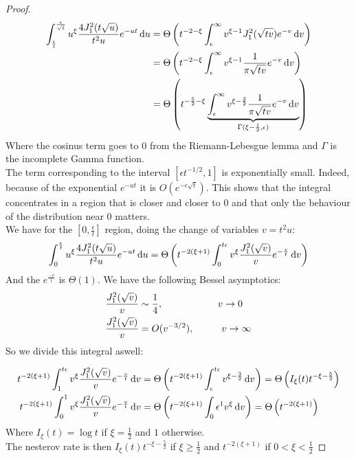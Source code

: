 \documentclass{article}
\begin{document}
\begin{proof}
\begin{align}
    \int_{\frac{\epsilon}{t}}^{\frac{\epsilon}{\sqrt{t}}} u^{\xi}\frac{4J_1^2(t\sqrt{u})}{t^2u}e^{-u t}\mathop{}\!\mathrm{d} u &=\Theta\left(
    t^{-2-\xi}\int_\epsilon^\infty v^{\xi-1}J_1^2(\sqrt{tv})e^{-v}\mathop{}\!\mathrm{d} v\right)\\
    &=\Theta\left( t^{-2-\xi}\int_\epsilon^\infty v^{\xi-1}\frac{1}{\pi\sqrt{tv}}e^{-v}\mathop{}\!\mathrm{d} v \right)\\
    &=\Theta\left(t^{-\frac{5}{2}-\xi}\underbrace{\int_\epsilon^\infty v^{\xi-\frac{3}{2}}\frac{1}{\pi\sqrt{tv}}e^{-v}\mathop{}\!\mathrm{d} v}_{\Gamma(\xi-\frac{1}{2},\epsilon) }\right)
\end{align}
Where the cosinus term goes to $0$ from the Riemann-Lebesgue lemma and $\Gamma$ is the incomplete Gamma function.\\
The term corresponding to the interval $[\epsilon t^{-1/2},1]$ is exponentially small. Indeed, because of the exponential $e^{-ut}$ it is  $O(e^{-\epsilon\sqrt{t}})$. This shows that the integral concentrates in a region that is closer and closer to $0$ and that only the behaviour of the distribution near $0$ matters.\\
We have for the $[0,\frac{\epsilon}{t}]$ region, doing the change of variables $v=t^2u$:
\begin{equation}
    \int_0^{\frac{\epsilon}{t}} u^{\xi}\frac{4J_1^2(t\sqrt{u})}{t^2u}e^{-u t}\mathop{}\!\mathrm{d} u =\Theta\left(
    t^{-2(\xi+1)}\int_0^{t\epsilon} v^{\xi}\frac{J_1^2(\sqrt{v})}{v}e^{-\frac{v}{t}}\mathop{}\!\mathrm{d} v\right)
\end{equation}
And the $e^{\frac{-v}{t}}$ is $\Theta(1)$. We have the following Bessel asymptotics:
\begin{align}
    \frac{J_1^2(\sqrt{v})}{v}&\sim \frac{1}{4}, \hspace{2 cm} v\rightarrow 0 \\
    \frac{J_1^2(\sqrt{v})}{v}&= O(v^{-3/2}), \hspace{1.0 cm} v\rightarrow \infty
\end{align}
So we divide this integral aswell:

\begin{align}
    t^{-2(\xi+1)}\int_1^{t\epsilon} v^{\xi}\frac{J_1^2(\sqrt{v})}{v}e^{-\frac{v}{t}}\mathop{}\!\mathrm{d} v
    &=\Theta\left(t^{-2(\xi+1)}\int_\epsilon^{t\epsilon} v^{\xi-\frac{3}{2}}\mathop{}\!\mathrm{d} v\right) =\Theta\left( I_\xi(t)t^{-\xi-\frac{5}{2}}\right)\\
    t^{-2(\xi+1)}\int_0^{1} v^{\xi}\frac{J_1^2(\sqrt{v})}{v}e^{-\frac{v}{t}}\mathop{}\!\mathrm{d} v
    &=\Theta\left(t^{-2(\xi+1)}\int_0\epsilon^{1} v^{\xi} \mathop{}\!\mathrm{d} v\right) =\Theta\left( t^{-2(\xi+1)}\right)
\end{align}
Where $I_\xi(t)=\log t$ if $\xi=\frac{1}{2}$ and $1$ otherwise. \\
The nesterov rate is then $I_\xi(t)t^{-\xi-\frac{5}{2}}$ if $\xi\geq\frac{1}{2}$ and $t^{-2(\xi+1)}$ if $0<\xi<\frac{1}{2}$
\end{proof}
\end{document}
